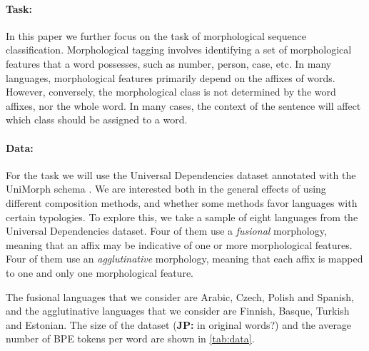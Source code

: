 \documentclass[11pt]{article}
\newcommand\jp[1]{(\textbf{JP:} #1)}
\begin{document}
        \paragraph{Task:} In this paper we further focus on the task
        of morphological sequence classification. Morphological
        tagging involves identifying a set of morphological features
        that a word possesses, such as number, person, case, etc. In
        many languages, morphological features primarily depend on the
        affixes of words. However, conversely, the morphological class
        is not determined by the word affixes, nor the whole word. In
        many cases, the context of the sentence will affect which
        class should be assigned to a word.

        \paragraph{Data:} For the task we will use the Universal
        Dependencies dataset \citep{nivre2018} annotated with the
        UniMorph schema \citep{mccarthy2018marrying}. We are
        interested both in the general effects of using different
        composition methods, and whether some methods favor languages
        with certain typologies. To explore this, we take a sample of
        eight languages from the Universal Dependencies dataset. Four
        of them use a \textit{fusional} morphology, meaning that an
        affix may be indicative of one or more morphological
        features. Four of them use an \textit{agglutinative}
        morphology, meaning that each affix is mapped to one and only
        one morphological feature.
    
   	The fusional languages that we consider are Arabic, Czech,
        Polish and Spanish, and the agglutinative languages that we
        consider are Finnish, Basque, Turkish and Estonian. The size
        of the dataset \jp{in original words?}  and the average number
        of BPE tokens per word are shown in \cref{tab:data}.
    
\end{document}
